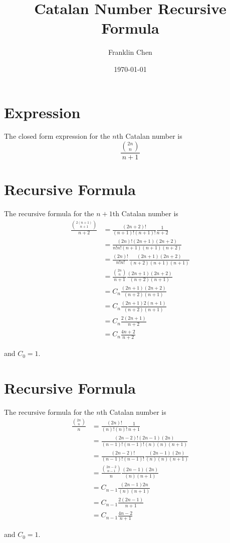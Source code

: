 \documentclass{article}
\begin{document}
\title{Catalan Number Recursive Formula}
\author{Franklin Chen}
\date{\today}
\maketitle

\section{Expression}
The closed form expression for the $n$th Catalan number is
\[
\frac{\binom{2n}{n}}{n+1}
\]

\section{Recursive Formula}
The recursive formula for the $n+1$th Catalan number is
\begin{align*}
\frac{\binom{2(n+1)}{n+1}}{n+2} &= \frac{(2n+2)!}{(n+1)!(n+1)!} \frac{1}{n+2} \\
&= \frac{(2n)!(2n+1)(2n+2)}{n!n!(n+1)(n+1)(n+2)} \\
&= \frac{(2n)!}{n!n!} \frac{(2n+1)(2n+2)}{(n+2)(n+1)(n+1)} \\
&= \frac{\binom{2n}{n}}{n+1} \frac{(2n+1)(2n+2)}{(n+2)(n+1)} \\
&= C_n \frac{(2n+1)(2n+2)}{(n+2)(n+1)} \\
&= C_n \frac{(2n+1)2(n+1)}{(n+2)(n+1)} \\
&= C_n \frac{2(2n+1)}{n+2} \\
&= C_n \frac{4n+2}{n+2}
\end{align*}

and $C_0 = 1.$

\section{Recursive Formula}
The recursive formula for the $n$th Catalan number is
\begin{align*}
\frac{\binom{2n}{n}}{n} &= \frac{(2n)!}{(n)!(n)!} \frac{1}{n+1} \\
&= \frac{(2n-2)!(2n-1)(2n)}{(n-1)!(n-1)!(n)(n)(n+1)} \\
&= \frac{(2n-2)!}{(n-1)!(n-1)!} \frac{(2n-1)(2n)}{(n)(n)(n+1)} \\
&= \frac{\binom{2n-2}{n-1}}{n} \frac{(2n-1)(2n)}{(n)(n+1)} \\
&= C_{n-1} \frac{(2n-1)2n}{(n)(n+1)} \\
&= C_{n-1} \frac{2(2n-1)}{n+1} \\
&= C_{n-1} \frac{4n-2}{n+1}
\end{align*}

and $C_0 = 1.$
\end{document}
